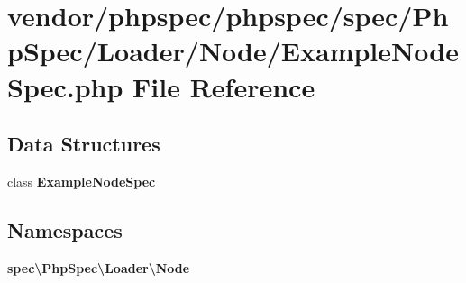 \section{vendor/phpspec/phpspec/spec/\+Php\+Spec/\+Loader/\+Node/\+Example\+Node\+Spec.php File Reference}
\label{_example_node_spec_8php}
\subsection*{Data Structures}
\begin{DoxyCompactItemize}
\item 
class {\bf Example\+Node\+Spec}
\end{DoxyCompactItemize}
\subsection*{Namespaces}
\begin{DoxyCompactItemize}
\item 
 {\bf spec\textbackslash{}\+Php\+Spec\textbackslash{}\+Loader\textbackslash{}\+Node}
\end{DoxyCompactItemize}
